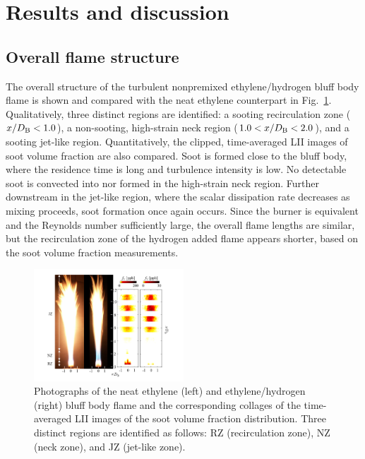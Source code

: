 \documentclass[review,3p,times]{elsarticle}
\begin{document}

\section{Results and discussion}

\subsection{Overall flame structure}

The overall structure of the turbulent nonpremixed ethylene/hydrogen bluff body flame is shown and compared with the neat ethylene counterpart in Fig.~\ref{fig:H2_overall}.  Qualitatively, three distinct regions are identified: a sooting recirculation zone ($x/D_{\rm B} < 1.0$), a non-sooting, high-strain neck region ($1.0 < x/D_{\rm B} < 2.0$), and a sooting jet-like region.  Quantitatively, the clipped, time-averaged LII images of soot volume fraction are also compared.  Soot is formed close to the bluff body, where the residence time is long and turbulence intensity is low.  No detectable soot is convected into nor formed in the high-strain neck region.   Further downstream in the jet-like region, where the scalar dissipation rate decreases as mixing proceeds, soot formation once again occurs.  Since the burner is equivalent and the Reynolds number sufficiently large, the overall flame lengths are similar, but the recirculation zone of the hydrogen added flame appears shorter, based on the soot volume fraction measurements.

\begin{figure}[t]
  \centering
  \scriptsize
  \vspace{-0.10in}
  \includegraphics[trim=14mm 5.0mm 14mm 5mm, clip=true, width=0.5\textwidth]{hy_overall_new.png}
  \normalsize
  \vspace{-0.1in}
  \caption{Photographs of the neat ethylene (left) and ethylene/hydrogen (right) bluff body flame and the corresponding collages of the time-averaged LII images of the soot volume fraction distribution.  Three distinct regions are identified as follows: RZ (recirculation zone), NZ (neck zone), and JZ (jet-like zone).}
  \label{fig:H2_overall}
\end{figure}
\end{document}
